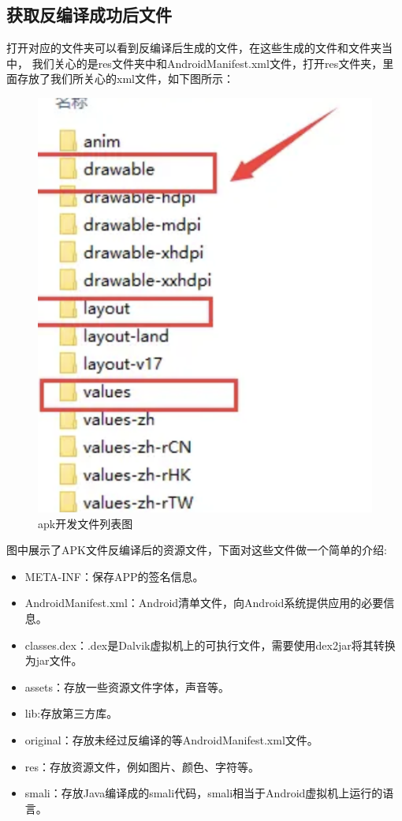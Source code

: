   \subsection*{获取反编译成功后文件}
  打开对应的文件夹可以看到反编译后生成的文件，在这些生成的文件和文件夹当中，
  我们关心的是res文件夹中和AndroidManifest.xml文件，打开res文件夹，里面存放了我们所关心的xml文件，如下图所示：
  \begin{figure}
    \centering
    \includegraphics[scale=0.5]{resources/img/i20.png}
    \caption{apk开发文件列表图}
  \end{figure}
  图中展示了APK文件反编译后的资源文件，下面对这些文件做一个简单的介绍:
  \begin{itemize}
    \item META-INF：保存APP的签名信息。
    \item AndroidManifest.xml：Android清单文件，向Android系统提供应用的必要信息。
    \item classes.dex：.dex是Dalvik虚拟机上的可执行文件，需要使用dex2jar将其转换为jar文件。
    \item assets：存放一些资源文件字体，声音等。
    \item lib:存放第三方库。
    \item original：存放未经过反编译的等AndroidManifest.xml文件。
    \item res：存放资源文件，例如图片、颜色、字符等。
    \item smali：存放Java编译成的smali代码，smali相当于Android虚拟机上运行的语言。
\end{itemize}
